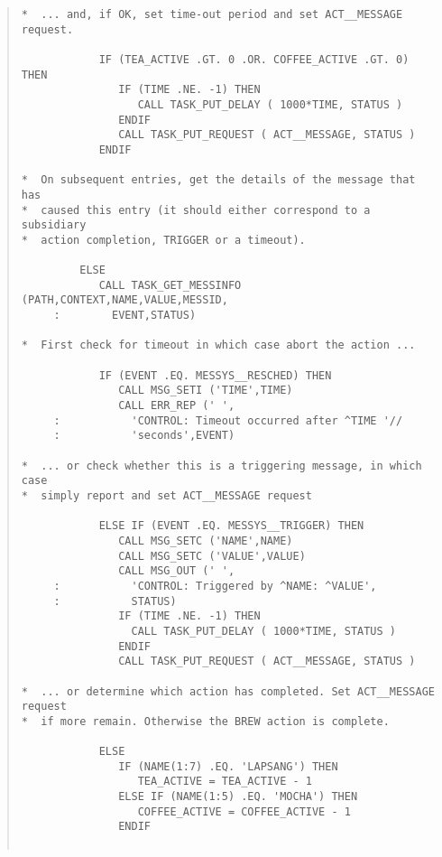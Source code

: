 \begin{quote}
\begin{verbatim}
*  ... and, if OK, set time-out period and set ACT__MESSAGE request.
 
            IF (TEA_ACTIVE .GT. 0 .OR. COFFEE_ACTIVE .GT. 0) THEN
               IF (TIME .NE. -1) THEN
                  CALL TASK_PUT_DELAY ( 1000*TIME, STATUS )
               ENDIF
               CALL TASK_PUT_REQUEST ( ACT__MESSAGE, STATUS )
            ENDIF
 
*  On subsequent entries, get the details of the message that has
*  caused this entry (it should either correspond to a subsidiary
*  action completion, TRIGGER or a timeout).
 
         ELSE
            CALL TASK_GET_MESSINFO (PATH,CONTEXT,NAME,VALUE,MESSID,
     :        EVENT,STATUS)

*  First check for timeout in which case abort the action ...

            IF (EVENT .EQ. MESSYS__RESCHED) THEN
               CALL MSG_SETI ('TIME',TIME)
               CALL ERR_REP (' ',
     :           'CONTROL: Timeout occurred after ^TIME '//
     :           'seconds',EVENT)

*  ... or check whether this is a triggering message, in which case
*  simply report and set ACT__MESSAGE request

            ELSE IF (EVENT .EQ. MESSYS__TRIGGER) THEN
               CALL MSG_SETC ('NAME',NAME)
               CALL MSG_SETC ('VALUE',VALUE)
               CALL MSG_OUT (' ',
     :           'CONTROL: Triggered by ^NAME: ^VALUE',
     :           STATUS)
               IF (TIME .NE. -1) THEN
                 CALL TASK_PUT_DELAY ( 1000*TIME, STATUS )
               ENDIF
               CALL TASK_PUT_REQUEST ( ACT__MESSAGE, STATUS )

*  ... or determine which action has completed. Set ACT__MESSAGE request
*  if more remain. Otherwise the BREW action is complete.
 
            ELSE
               IF (NAME(1:7) .EQ. 'LAPSANG') THEN
                  TEA_ACTIVE = TEA_ACTIVE - 1
               ELSE IF (NAME(1:5) .EQ. 'MOCHA') THEN
                  COFFEE_ACTIVE = COFFEE_ACTIVE - 1
               ENDIF


\end{verbatim}
\end{quote}
